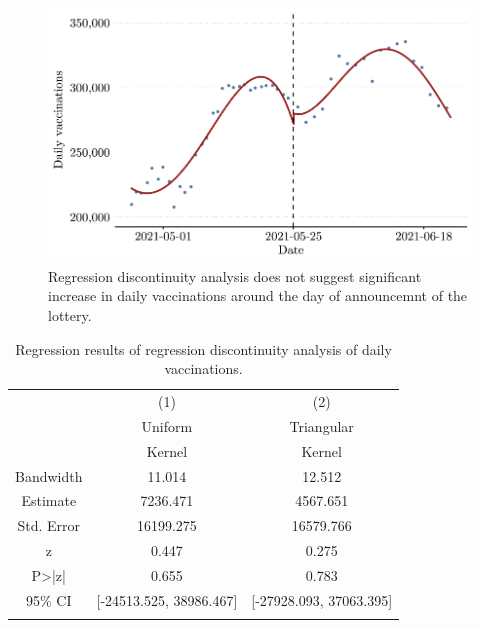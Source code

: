 \documentclass{scrbook}
\begin{document}
\begin{figure}[h]
\caption[Regression discontinuity analysis of daily vaccinations in Poland]{Regression discontinuity analysis does not suggest significant increase in daily vaccinations around the day of announcemnt of the lottery.}

\begin{center}\includegraphics{bachelor_thesis_files/figure-latex/unnamed-chunk-2-1} \end{center}
\end{figure}

\vspace{-1.2cm}
\begin{table}[! htbp]\centering \caption[Results of regression discontinuity analysis of daily vaccinations in Poland]{Regression results of regression discontinuity analysis of daily vaccinations.}
\bigskip
\label{table:weightssynth}
\begin{threeparttable}
\begin{tabular}{c c c}
\toprule
 & (1) & (2)\\
 & Uniform & Triangular\\
 & Kernel & Kernel\\ \midrule
Bandwidth & 11.014 & 12.512\\
Estimate & 7236.471 & 4567.651\\
Std. Error & 16199.275 & 16579.766\\
z & 0.447 & 0.275\\
P>|z| & 0.655 & 0.783\\
95\% CI & [-24513.525, 38986.467] & [-27928.093, 37063.395]\\
\bottomrule\addlinespace[1ex]
\end{tabular}
\end{threeparttable}
\label{table2}
\end{table}
\end{document}
